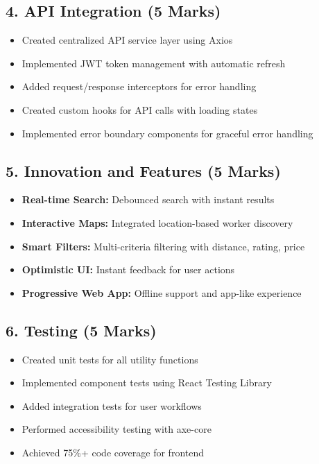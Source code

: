 \documentclass[12pt,a4paper]{article}
\begin{document}
\subsection*{4. API Integration (5 Marks)}
\begin{itemize}[leftmargin=*]
    \item Created centralized API service layer using Axios
    \item Implemented JWT token management with automatic refresh
    \item Added request/response interceptors for error handling
    \item Created custom hooks for API calls with loading states
    \item Implemented error boundary components for graceful error handling
\end{itemize}

\subsection*{5. Innovation and Features (5 Marks)}
\begin{itemize}[leftmargin=*]
    \item \textbf{Real-time Search:} Debounced search with instant results
    \item \textbf{Interactive Maps:} Integrated location-based worker discovery
    \item \textbf{Smart Filters:} Multi-criteria filtering with distance, rating, price
    \item \textbf{Optimistic UI:} Instant feedback for user actions
    \item \textbf{Progressive Web App:} Offline support and app-like experience
\end{itemize}

\subsection*{6. Testing (5 Marks)}
\begin{itemize}[leftmargin=*]
    \item Created unit tests for all utility functions
    \item Implemented component tests using React Testing Library
    \item Added integration tests for user workflows
    \item Performed accessibility testing with axe-core
    \item Achieved 75\%+ code coverage for frontend
\end{itemize}
\end{document}
